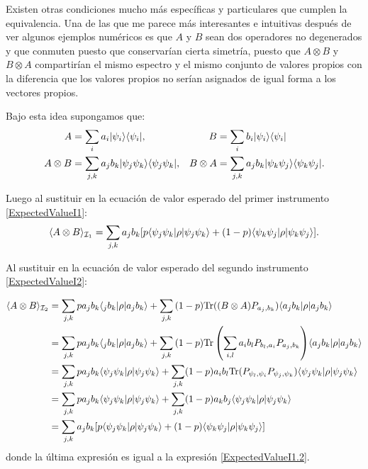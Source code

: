 \documentclass[12pt,oneside]{book}\raggedbottom{}
\begin{document}
Existen otras condiciones mucho más específicas y particulares que cumplen la equivalencia. Una de las que me parece más interesantes e intuitivas después de ver algunos ejemplos numéricos es que $A$ y $B$ sean dos operadores no degenerados y que conmuten puesto que conservarían cierta simetría, puesto que $A\otimes B$ y $B\otimes A$ compartirían el mismo espectro y el mismo conjunto de valores propios con la diferencia que los valores propios no serían asignados de igual forma a los vectores propios.


Bajo esta idea supongamos que: \begin{align}
    A&=\sum_i a_i |\psi_i\rangle \langle \psi_i|,& B&=\sum_i b_i |\psi_i\rangle \langle \psi_i|\\
    A\otimes B&= \sum_{j,k}a_j b_k |\psi_j\psi_k\rangle \langle\psi_j\psi_k|,&  B\otimes A&= \sum_{j,k}a_j b_k |\psi_k\psi_j\rangle \langle\psi_k\psi_j|.
\end{align}



Luego al sustituir en la ecuación de valor esperado del primer instrumento  {\ref{ExpectedValueI1}}:\begin{equation}\label{ExpectedValueI1.2}\langle A\otimes B\rangle_{\mathcal{I}_1}=\sum_{j,k}a_j b_k[p\langle \psi_j \psi_k|\rho |\psi_j \psi_k\rangle + (1-p)\langle \psi_k \psi_j|\rho | \psi_k \psi_j\rangle]. \end{equation}

Al sustituir en la ecuación de valor esperado del segundo instrumento {\ref{ExpectedValueI2}}:

\[\begin{split}
	\langle A\otimes B \rangle_{\mathcal{I}_2}&=\sum_{j,k}p a_{j}b_k  \langle_j b_k|\rho |a_j b_k\rangle+\sum_{j,k}{(1-p){\rm Tr}( (B\otimes A)P_{a_j,b_k})} \langle a_j b_k|\rho |a_j b_k\rangle \\
    &=\sum_{j,k}p a_{j}b_k  \langle_j b_k|\rho |a_j b_k\rangle+\sum_{j,k}{(1-p){\rm Tr}\left( \sum_{i,l}a_i b_l P_{b_l,a_i}P_{a_j,b_k}\right)} \langle a_j b_k|\rho |a_j b_k\rangle \\
    &=\sum_{j,k}p a_{j}b_k  \langle\psi_j \psi_k|\rho |\psi_j \psi_k\rangle+\sum_{j,k}(1-p) a_i b_l {\rm Tr}(P_{\psi_l,\psi_i}P_{\psi_j,\psi_k})\langle \psi_j \psi_k|\rho |\psi_j \psi_k\rangle \\
    &=\sum_{j,k}p a_{j}b_k  \langle\psi_j \psi_k|\rho |\psi_j \psi_k\rangle+\sum_{j,k}(1-p) a_k b_j \langle \psi_j \psi_k|\rho |\psi_j \psi_k\rangle \\
    &=\sum_{j,k} a_{j} b_k[p  \langle\psi_j \psi_k|\rho |\psi_j \psi_k\rangle+(1-p) \langle \psi_k\psi_j|\rho |\psi_k \psi_j\rangle] \\
\end{split}\]
 donde la última expresión es igual a la expresión  {\ref{ExpectedValueI1.2}}.
\end{document}
